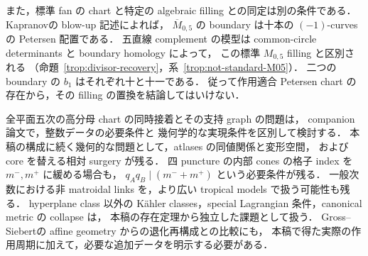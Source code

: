 また，標準 fan の chart と特定の algebraic filling との同定は別の条件である．
Kapranov\cite[Theorem~4.3.3]{KapranovChow}の blow-up 記述によれば，
$\overline M_{0,5}$ の boundary は十本の $(-1)$-curves の Petersen 配置である．
五直線 complement の模型は common-circle determinants と boundary homology によって，
この標準 $M_{0,5}$ filling と区別される
（命題~\ref{trop:divisor-recovery}，系~\ref{trop:not-standard-M05}）．
二つの boundary の $b_1$ はそれぞれ十と十一である．
従って作用適合 Petersen chart の存在から，その filling の置換を結論してはいけない．

全平面五次の高分母 chart の同時接着とその支持 graph の問題は，
companion 論文\cite{QuinticArithmetic}で，整数データの必要条件と
幾何学的な実現条件を区別して検討する．
本稿の構成に続く幾何的な問題として，atlases の同値関係と変形空間，
および core を替える相対 surgery が残る．
四 puncture の内部 cones の格子 index を $m^-,m^+$ に緩める場合も，
$q_Aq_B\mid(m^-+m^+)$ という必要条件が残る．
一般次数における非 matroidal links を，より広い tropical models で扱う可能性も残る．
hyperplane class 以外の Kähler classes，special Lagrangian 条件，canonical metric の collapse は，
本稿の存在定理から独立した課題として扱う．
Gross--Siebert\cite{GrossSiebert}の affine geometry からの退化再構成との比較にも，
本稿で得た実際の作用周期に加えて，必要な追加データを明示する必要がある．
